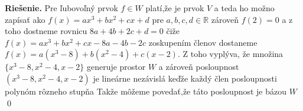 \documentclass{article}
\theoremstyle{definition}
\theoremstyle{plain}
\newcommand{\R}{\mathbb{R}}
\newenvironment{solution}{\noindent\textbf{Riešenie.}\hspace{0.5em}}{\hfill\qed\medskip}
\begin{document}
\begin{solution}
Pre ľubovoľný prvok $f\in W$ platí,že je prvok $V$ a teda ho možno zapísať ako $f(x) = ax^3+bx^2+cx+d$ pre $a,b,c,d\in\R$ zároveň $f(2)=0$ a z toho dostneme rovnicu $8a+4b+2c+d=0$ čiže 
$f(x)=ax^3+bx^2+cx -8a-4b-2c$ zoskupením členov dostaneme $f(x)=a(x^3-8)+b(x^2-4)+c(x-2)$. Z toho vyplýva, že množina $\{x^3-8,x^2-4,x-2\}$ generuje prostor $W$ a zároveň posloupnost $(x^3-8,x^2-4,x-2)$ je lineárne nezávislá keďže každý člen posloupnosti polynóm rôzneho stupňa Takže môžeme povedať,že táto posloupnost je bázou $W$
\end{solution}
\end{document}

